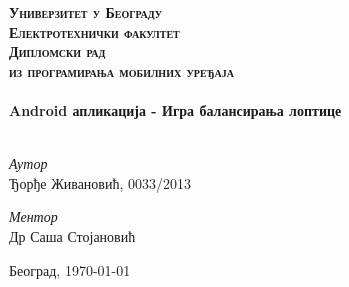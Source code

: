 

\begin{titlepage}

\begin{center}



\textsc{\Huge \textbf{Универзитет у Београду}} \\[1cm]
\textsc{\Huge \textbf{Електротехнички факултет}}\\[5cm]

\textsc{\Huge \textbf{Дипломски рад }}\\[0.5cm]
\textsc{\large{\textbf{из програмирања мобилних уређаја}}}
\\[4cm]

\HRule \\[0.8cm]
{ \Huge \bfseries Android апликација - Игра балансирања лоптице}\\[0.4cm]

\HRule \\[5cm]

\begin{minipage}{0.55\textwidth}
\begin{flushleft} \large
\emph{Аутор}\\
Ђорђе Живановић, 0033/2013\\
\end{flushleft}
\end{minipage}
\begin{minipage}{0.4\textwidth}
\begin{flushright} \large
\emph{Ментор} \\
Др Саша Стојановић
\end{flushright}
\end{minipage}



\vfill

{\large Београд, \today}

\end{center}

\end{titlepage}